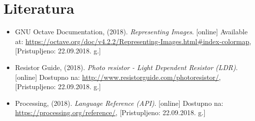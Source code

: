 \documentclass{article}
\begin{document}
\section{Literatura}
    \begin{itemize}
        \item GNU Octave Documentation, (2018). \textit{Representing Images}. [online] Available at: \url{https://octave.org/doc/v4.2.2/Representing-Images.html#index-colormap}, [Pristupljeno: 22.09.2018. g.]
        \item Resistor Guide, (2018). \textit{Photo resistor - Light Dependent Resistor (LDR)}. [online] Dostupno na: \url{http://www.resistorguide.com/photoresistor/}, [Pristupljeno: 22.09.2018. g.]
        \item Processing, (2018). \textit{Language Reference (API)}. [online] Dostupno na: \url{https://processing.org/reference/}, [Pristupljeno: 22.09.2018. g.]
    \end{itemize}
\end{document}
